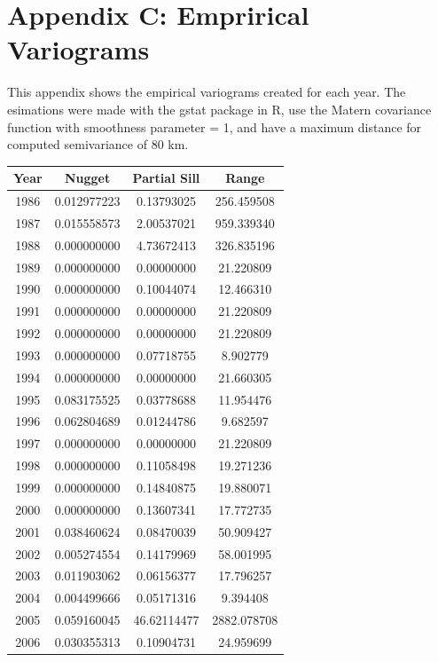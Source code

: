 \section{Appendix C: Emprirical Variograms}
This appendix shows the empirical variograms created for each year.  The esimations were made with the gstat package in R, use the Matern covariance function with smoothness parameter = 1, and have a maximum distance for computed semivariance of 80 km.


\begin{table}[]
    \centering
    \begin{tabular}{c|c|c|c}
         Year & Nugget & Partial Sill & Range  \\
         \hline
  1986 & 0.012977223 & 0.13793025 & 256.459508 \\
  1987 & 0.015558573 & 2.00537021 & 959.339340 \\
  1988 & 0.000000000 & 4.73672413 & 326.835196 \\
  1989 & 0.000000000 & 0.00000000 &  21.220809 \\
  1990 & 0.000000000 & 0.10044074 &  12.466310 \\
  1991 & 0.000000000 & 0.00000000 &  21.220809 \\
  1992 & 0.000000000 & 0.00000000 &  21.220809 \\
  1993 & 0.000000000 & 0.07718755 &  8.902779 \\
  1994 & 0.000000000 & 0.00000000 &  21.660305 \\
 1995 & 0.083175525 & 0.03778688  & 11.954476 \\
 1996 & 0.062804689 & 0.01244786  &  9.682597 \\
 1997 & 0.000000000 & 0.00000000  & 21.220809 \\
 1998 & 0.000000000 & 0.11058498  & 19.271236 \\
 1999 & 0.000000000 & 0.14840875  & 19.880071 \\
 2000 & 0.000000000 & 0.13607341  & 17.772735 \\
 2001 & 0.038460624 & 0.08470039  & 50.909427 \\
 2002 & 0.005274554 & 0.14179969  & 58.001995 \\
 2003 & 0.011903062 & 0.06156377  & 17.796257 \\
 2004 & 0.004499666 & 0.05171316  &  9.394408 \\
 2005 & 0.059160045 & 46.62114477 & 2882.078708 \\
 2006 & 0.030355313 & 0.10904731  & 24.959699 \\

\end{tabular}
\end{table}
